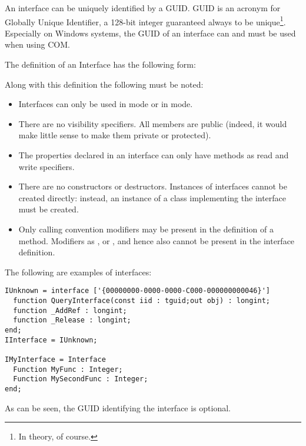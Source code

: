 An interface can be uniquely identified by a GUID. GUID is an acronym for
Globally Unique Identifier, a 128-bit integer guaranteed always to be 
unique\footnote{In theory, of course.}. Especially on Windows systems, 
the GUID of an interface can and must be used when using COM.

The definition of an Interface has the following
form:

Along with this definition the following must be noted:
\begin{itemize}
\item Interfaces can only be used in  mode or in 
mode.
\item There are no visibility specifiers. All members are public (indeed,
it would make little sense to make them private or
protected).
\item The properties declared in an interface can only have methods as read and
write specifiers.
\item There are no constructors or destructors. Instances of interfaces
cannot be created directly: instead, an instance of a class implementing 
the interface must be created.
\item Only calling convention modifiers may be present in the definition of
a method. Modifiers as ,  or , and
hence also  cannot be present in the interface 
definition.
\end{itemize}
The following are examples of interfaces:
\begin{verbatim}
IUnknown = interface ['{00000000-0000-0000-C000-000000000046}']
  function QueryInterface(const iid : tguid;out obj) : longint;
  function _AddRef : longint;
  function _Release : longint;
end;
IInterface = IUnknown;

IMyInterface = Interface
  Function MyFunc : Integer;
  Function MySecondFunc : Integer;
end;
\end{verbatim}
As can be seen, the GUID identifying the interface is optional.

